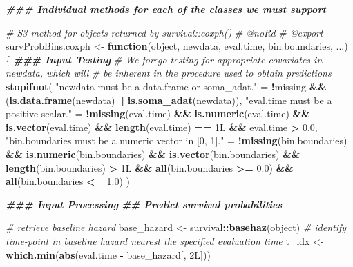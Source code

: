 \documentclass[
]{book}
\newenvironment{Shaded}{\begin{snugshade}}{\end{snugshade}}
\newcommand{\CommentTok}[1]{\textcolor[rgb]{0.56,0.35,0.01}{\textit{#1}}}
\newcommand{\ControlFlowTok}[1]{\textcolor[rgb]{0.13,0.29,0.53}{\textbf{#1}}}
\newcommand{\DocumentationTok}[1]{\textcolor[rgb]{0.56,0.35,0.01}{\textbf{\textit{#1}}}}
\newcommand{\FloatTok}[1]{\textcolor[rgb]{0.00,0.00,0.81}{#1}}
\newcommand{\FunctionTok}[1]{\textcolor[rgb]{0.13,0.29,0.53}{\textbf{#1}}}
\newcommand{\NormalTok}[1]{#1}
\newcommand{\OtherTok}[1]{\textcolor[rgb]{0.56,0.35,0.01}{#1}}
\newcommand{\SpecialCharTok}[1]{\textcolor[rgb]{0.81,0.36,0.00}{\textbf{#1}}}
\newcommand{\StringTok}[1]{\textcolor[rgb]{0.31,0.60,0.02}{#1}}
\begin{document}
\begin{Shaded}
\begin{Highlighting}[]
\DocumentationTok{\#\#\# Individual methods for each of the classes we must support}

\CommentTok{\#\textquotesingle{} S3 method for objects returned by \textasciigrave{}survival::coxph()\textasciigrave{}}
\CommentTok{\#\textquotesingle{} @noRd}
\CommentTok{\#\textquotesingle{} @export}
\NormalTok{survProbBins.coxph }\OtherTok{\textless{}{-}} \ControlFlowTok{function}\NormalTok{(object, newdata, eval.time, bin.boundaries, ...) \{}
  \DocumentationTok{\#\#\# Input Testing}
  \CommentTok{\# We forego testing for appropriate covariates in \textasciigrave{}newdata\textasciigrave{}, which will}
  \CommentTok{\#   be inherent in the procedure used to obtain predictions}
  \FunctionTok{stopifnot}\NormalTok{(}
    \StringTok{"\textasciigrave{}newdata\textasciigrave{} must be a data.frame or soma\_adat."} \OtherTok{=} 
      \SpecialCharTok{!}\NormalTok{missing }\SpecialCharTok{\&\&}\NormalTok{ (}\FunctionTok{is.data.frame}\NormalTok{(newdata) }\SpecialCharTok{||} \FunctionTok{is.soma\_adat}\NormalTok{(newdata)),}
    \StringTok{"\textasciigrave{}eval.time\textasciigrave{} must be a positive scalar."} \OtherTok{=} 
      \SpecialCharTok{!}\FunctionTok{missing}\NormalTok{(eval.time) }\SpecialCharTok{\&\&} \FunctionTok{is.numeric}\NormalTok{(eval.time) }\SpecialCharTok{\&\&} 
        \FunctionTok{is.vector}\NormalTok{(eval.time) }\SpecialCharTok{\&\&} \FunctionTok{length}\NormalTok{(eval.time) }\SpecialCharTok{==}\NormalTok{ 1L }\SpecialCharTok{\&\&}\NormalTok{ eval.time }\SpecialCharTok{\textgreater{}} \FloatTok{0.0}\NormalTok{,}
    \StringTok{"\textasciigrave{}bin.boundaries\textasciigrave{} must be a numeric vector in [0, 1]."} \OtherTok{=} 
      \SpecialCharTok{!}\FunctionTok{missing}\NormalTok{(bin.boundaries) }\SpecialCharTok{\&\&} \FunctionTok{is.numeric}\NormalTok{(bin.boundaries) }\SpecialCharTok{\&\&} 
        \FunctionTok{is.vector}\NormalTok{(bin.boundaries) }\SpecialCharTok{\&\&} \FunctionTok{length}\NormalTok{(bin.boundaries) }\SpecialCharTok{\textgreater{}}\NormalTok{ 1L }\SpecialCharTok{\&\&} 
        \FunctionTok{all}\NormalTok{(bin.boundaries }\SpecialCharTok{\textgreater{}=} \FloatTok{0.0}\NormalTok{) }\SpecialCharTok{\&\&} \FunctionTok{all}\NormalTok{(bin.boundaries }\SpecialCharTok{\textless{}=} \FloatTok{1.0}\NormalTok{)}
\NormalTok{  )}
  
  \DocumentationTok{\#\#\# Input Processing}
  \DocumentationTok{\#\# Predict survival probabilities}
  
  \CommentTok{\# retrieve baseline hazard}
\NormalTok{  base\_hazard }\OtherTok{\textless{}{-}}\NormalTok{ survival}\SpecialCharTok{::}\FunctionTok{basehaz}\NormalTok{(object)}
  \CommentTok{\# identify time{-}point in baseline hazard nearest the specified evaluation time}
\NormalTok{  t\_idx       }\OtherTok{\textless{}{-}} \FunctionTok{which.min}\NormalTok{(}\FunctionTok{abs}\NormalTok{(eval.time }\SpecialCharTok{{-}}\NormalTok{ base\_hazard[, 2L]))}
  

\end{Highlighting}
\end{Shaded}
\end{document}
